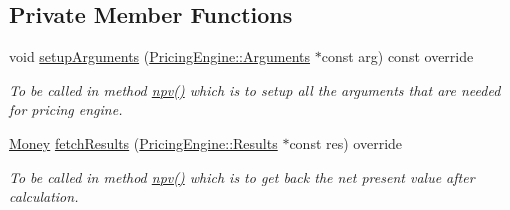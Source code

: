 \subsection*{Private Member Functions}
\begin{DoxyCompactItemize}
\item 
void \hyperlink{class_asian_option_a82c9b5fb3bea69f476a65e9675e1cc28}{setup\+Arguments} (\hyperlink{class_pricing_engine_1_1_arguments}{Pricing\+Engine\+::\+Arguments} $\ast$const arg) const override
\begin{DoxyCompactList}\small\item\em To be called in method \hyperlink{class_instrument_aa750f2ae95a21d65a073da3171e8d084}{npv()} which is to setup all the arguments that are needed for pricing engine. \end{DoxyCompactList}\item 
\hyperlink{_name_def_8h_a5a9d48c16a694e9a2d9f1eca730dc8c5}{Money} \hyperlink{class_asian_option_a99cd9956b73d99a64748c913dcccd6ea}{fetch\+Results} (\hyperlink{class_pricing_engine_1_1_results}{Pricing\+Engine\+::\+Results} $\ast$const res) override
\begin{DoxyCompactList}\small\item\em To be called in method \hyperlink{class_instrument_aa750f2ae95a21d65a073da3171e8d084}{npv()} which is to get back the net present value after calculation. \end{DoxyCompactList}\end{DoxyCompactItemize}
